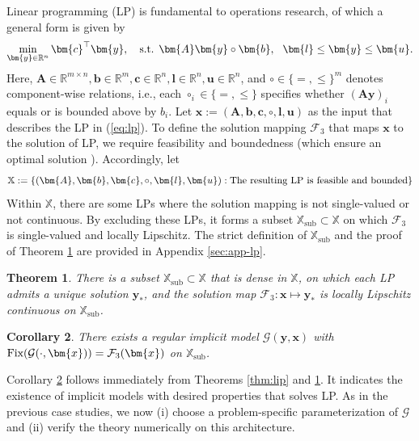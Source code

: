 \documentclass{amsart} %
\def\eqref#1{equation~\ref{#1}}
\def\vb{{\bm{b}}}
\def\vc{{\bm{c}}}
\def\vl{{\bm{l}}}
\def\vu{{\bm{u}}}
\def\vx{{\bm{x}}}
\def\vy{{\bm{y}}}
\def\mA{{\bm{A}}}
\def\sR{{\mathbb{R}}}
\def\sX{{\mathbb{X}}}
\def\cF{{\mathcal{F}}}
\def\cG{{\mathcal{G}}}
\newtheorem{theorem}{Theorem}[section]
\newtheorem{corollary}[theorem]{Corollary}
\theoremstyle{definition}
\theoremstyle{remark}
\renewcommand{\eqref}[1]{\textup{(\ref{#1})}}
\begin{document}
Linear programming (LP) is fundamental to operations research, of which a general form is given by 
\begin{equation}
\label{eq:lp}
\min_{\vy \in \sR^n} \vc^\top \vy, \quad \textup{s.t. } \mA \vy \circ \vb, ~~ \vl \leq \vy \leq \vu.
\end{equation}
Here, $\mA \in \sR^{m \times n}, \vb \in \sR^{m}, \vc \in \sR^n, \vl \in \sR^n, \vu \in \sR^n$, and $\circ\in\{=,\le\}^{m}$ denotes component-wise relations, i.e., each $\circ_i\in\{=,\le\}$ specifies whether $(\mA\vy)_i$ equals or is bounded above by $b_i$.
Let $\vx := (\mA,\vb,\vc,\circ,\vl,\vu)$ as the input that describes the LP in \eqref{eq:lp}. To define the solution mapping $\cF_3$ that maps $\vx$ to the solution of LP, we require feasibility and boundedness (which ensure an optimal solution \cite{bertsimas1997introduction}). Accordingly, let
\[ \sX:= \{(\mA,\vb,\vc,\circ,\vl,\vu): \textup{The resulting LP is feasible and bounded}\}
\]
Within $\sX$, there are some LPs where the solution mapping is not single-valued or not continuous. By excluding these LPs, it forms a subset $\sX_{\mathrm{sub}} \subset \sX$ on which $\cF_3$ is single-valued and locally Lipschitz. The strict definition of $\sX_{\mathrm{sub}}$ and the proof of Theorem \ref{thm:lp} are provided in Appendix \ref{sec:app-lp}.
\begin{theorem}
\label{thm:lp}
There is a subset $\sX_{\mathrm{sub}}\subset \sX$ that is dense in $\sX$, on which each LP admits a unique solution $\vy_\ast$, and the solution map $\cF_3:\vx\mapsto\vy_\ast$ is locally Lipschitz continuous on $\sX_{\mathrm{sub}}$.
\end{theorem}

\begin{corollary}
\label{coro:lp}
There exists a regular implicit model $\cG(\vy,\vx)$ with $\textup{Fix}(\cG(\cdot,\vx)) = \cF_3(\vx)$ on $\sX_{\mathrm{sub}}$.
\end{corollary}

Corollary \ref{coro:lp} follows immediately from Theorems \ref{thm:lip} and \ref{thm:lp}. It indicates the existence of implicit models with desired properties that solves LP. As in the previous case studies, we now (i) choose a problem-specific parameterization of $\cG$ and (ii) verify the theory numerically on this architecture. 
\end{document}
